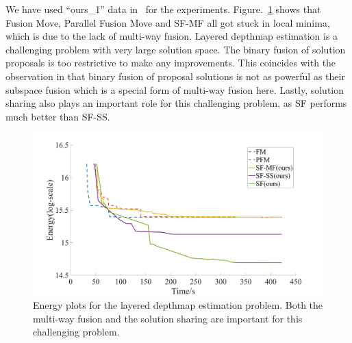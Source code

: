 
\noindent We have used ``ours\_1'' data in~\cite{layered_depthmap} for
the experiments. Figure.~\ref{fig:layered_depthmap_convergence} shows that
Fusion Move, Parallel Fusion Move and SF-MF all got stuck in local
minima, which is due to the lack of multi-way fusion.  Layered depthmap
estimation is a challenging problem with very large solution space. The
binary fusion of solution proposals is too restrictive to make any
improvements.  This coincides with the observation in
\cite{layered_depthmap} that binary fusion of proposal solutions is not
as powerful as their subspace fusion which is a special form of
multi-way fusion here. Lastly, solution sharing also plays an important
role for this challenging problem, as SF performs much better than
SF-SS.

\begin{figure}[!h]
  \centering
  \includegraphics[width=0.8\columnwidth]{figure/layered_depthmap_convergence.png}
  \caption{Energy plots for the layered depthmap estimation
    problem. Both the multi-way fusion and the solution sharing are important
    for this challenging problem.}\label{fig:layered_depthmap_convergence}
\end{figure}

